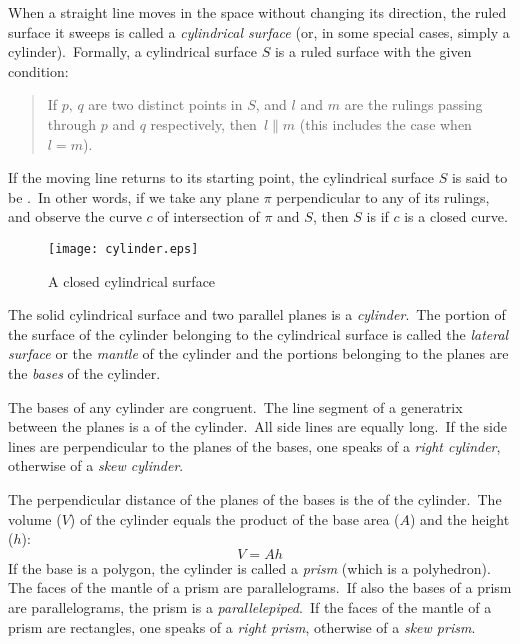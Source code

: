 \documentclass{article}
\theoremstyle{definition}
\begin{document}

When a straight line moves in the space without changing its direction, the ruled surface it sweeps is called a {\em cylindrical surface} (or, in some special cases, simply a cylinder).\, Formally, a cylindrical surface $S$ is a ruled surface with the given condition: 
\begin{quote}
If $p,\,q$ are two distinct points in $S$, and $l$ and $m$ are the rulings passing through $p$ and $q$ respectively, then\, $l \parallel m$ (this includes the case when\, $l = m$).
\end{quote}
If the moving line returns to its starting point, the cylindrical surface $S$ is said to be .\, In other words, if we take any plane $\pi$ perpendicular to any of its rulings, and observe the curve $c$ of intersection of $\pi$ and $S$, then $S$ is  if $c$ is a closed curve.

\begin{figure}
\begin{center}
\texttt{[image: cylinder.eps]}
\end{center}
\caption{A closed cylindrical surface}
\end{figure}

The solid  cylindrical surface and two parallel planes is a {\em cylinder}.\, The portion of the surface of the cylinder belonging to the cylindrical surface is called the {\em lateral surface} or the {\em mantle} of the cylinder and the portions belonging to the planes are the {\em bases} of the cylinder.

The bases of any cylinder are congruent.\, The line segment of a generatrix between the planes is a  of the cylinder.\, All side lines are equally long.\, If the side lines are perpendicular to the planes of the bases, one speaks of a {\em right cylinder}, otherwise of a {\em skew cylinder}.

The perpendicular distance of the planes of the bases is the  of the cylinder.\, The volume ($V$) of the cylinder equals the product of the base area ($A$) and the height ($h$):
                              $$V = Ah$$
If the base is a polygon, the cylinder is called a {\em prism} (which is a polyhedron).\, The faces of the mantle of a prism are parallelograms.\, If also the bases of a prism are parallelograms, the prism is a {\em parallelepiped}.\, If the faces of the mantle of a prism are rectangles, one speaks of a {\em right prism}, otherwise of a {\em skew prism}.\, 
\end{document}
